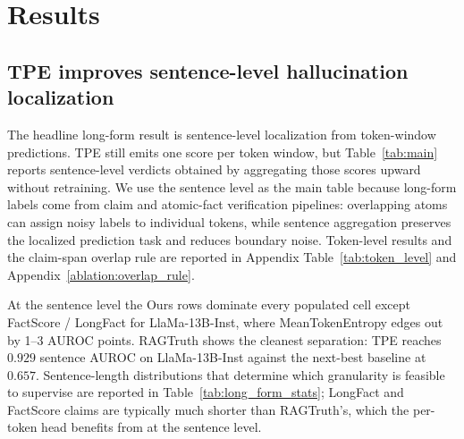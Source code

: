 \section{Results}
\label{sec:results}

\subsection{TPE improves sentence-level hallucination localization}
\label{sec:results_aggregated}

The headline long-form result is sentence-level localization from
token-window predictions. TPE still emits one score per token window,
but Table~\ref{tab:main} reports sentence-level verdicts obtained by
aggregating those scores upward without retraining. We use the
sentence level as the main table because long-form labels come from
claim and atomic-fact verification pipelines: overlapping atoms can
assign noisy labels to individual tokens, while sentence aggregation
preserves the localized prediction task and reduces boundary noise.
Token-level results and the claim-span overlap rule are reported in
Appendix Table~\ref{tab:token_level} and
Appendix~\ref{ablation:overlap_rule}.

At the sentence level the Ours rows dominate every populated cell
except FactScore / LongFact for LlaMa-13B-Inst, where MeanTokenEntropy
edges out by 1--3 AUROC points. RAGTruth shows the cleanest
separation: TPE reaches $0.929$ sentence AUROC on
LlaMa-13B-Inst against the next-best baseline at $0.657$.
Sentence-length distributions
that determine which granularity is feasible to supervise are
reported in Table~\ref{tab:long_form_stats}; LongFact and
FactScore claims are typically much shorter than RAGTruth's,
which the per-token head benefits from at the sentence level.
